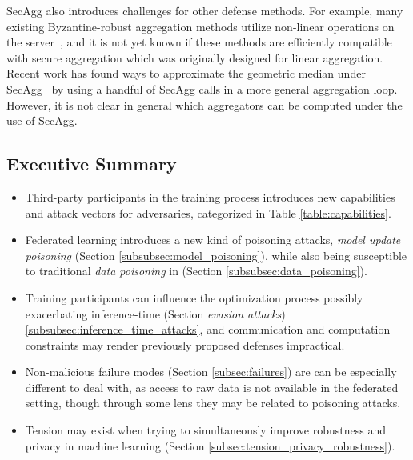 \documentclass[11pt]{article}
\begin{document}
SecAgg also introduces challenges for other defense methods. For example, many existing Byzantine-robust aggregation methods utilize non-linear operations on the server~\citet{xie2019practicalsecure}, and it is not yet known if these methods are efficiently compatible with secure aggregation which was originally designed for linear aggregation. Recent work has found ways to approximate the geometric median under SecAgg~\citep{pillutla2019robust} by using a handful of SecAgg calls in a more general aggregation loop. However, it is not clear in general which aggregators can be computed under the use of SecAgg.

\subsection{Executive Summary}
\label{subsec:attacks_and_failures_summary}

% 

\begin{itemize}
    \item Third-party participants in the training process introduces new capabilities and attack vectors for adversaries, categorized in Table \ref{table:capabilities}.
    \item Federated learning introduces a new kind of poisoning attacks, \emph{model update poisoning} (Section \ref{subsubsec:model_poisoning}), while also being susceptible to traditional \emph{data poisoning} in (Section \ref{subsubsec:data_poisoning}).
    \item Training participants can influence the optimization process possibly exacerbating inference-time (Section \emph{evasion attacks}) \ref{subsubsec:inference_time_attacks}, and communication and computation constraints may render previously proposed defenses impractical.
    \item Non-malicious failure modes (Section \ref{subsec:failures}) are can be especially different to deal with, as access to raw data is not available in the federated setting, though through some lens they may be related to poisoning attacks.
    \item Tension may exist when trying to simultaneously improve robustness and privacy in machine learning (Section \ref{subsec:tension_privacy_robustness}).
\end{itemize}
\end{document}
